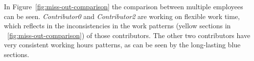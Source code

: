 In Figure~\ref{fig:miss-out-comparison} the comparison between multiple employees can be seen.
\emph{Contributor0} and \emph{Contributor2} are working on flexible work time, which reflects in the inconsistencies in the work patterns (yellow sections in ~\ref{fig:miss-out-comparison}) of those contributors.
The other two contributors have very consistent working hours patterns, as can be seen by the long-lasting blue sections.
